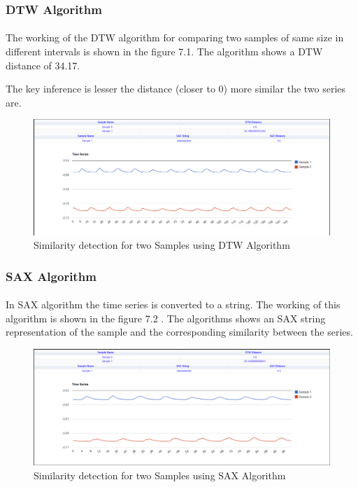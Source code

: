 \documentclass[12pt,a4paper]{report}
\begin{document}
\subsubsection{DTW Algorithm }
\paragraph{} The working of the DTW algorithm for comparing two samples of same size in different intervals is shown in the figure 7.1. The algorithm shows a DTW distance of 34.17. 


The key inference is lesser the distance (closer to 0) more similar the two series are.
\begin{figure}[h!]

  \centering
    \includegraphics[scale=0.35]{./screenshots/result_sim_dtw.png}
  \caption{Similarity detection for two Samples using DTW Algorithm}
\end{figure}
\subsubsection{SAX Algorithm }
\paragraph{} In SAX algorithm the time series is converted to a string. The working of this algorithm is shown in the figure 7.2 . The algorithms shows an SAX string representation of the sample and the corresponding similarity between the series.
\begin{figure}[h!]

  \centering
    \includegraphics[scale=0.35]{./screenshots/result_sim_sax.png}
  \caption{Similarity detection for two Samples using SAX Algorithm}
\end{figure}
\end{document}
